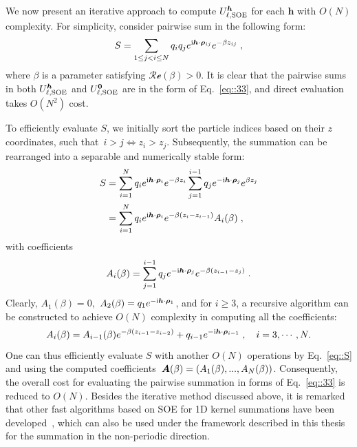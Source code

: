 We now present an iterative approach to compute $U_{\ell,\text{SOE}}^{\boldsymbol{h}}$ for each $\bm{h}$ with $O(N)$ complexity. 
For simplicity, consider pairwise sum in the following form:
\begin{equation}\label{eq::33}
	S = \sum_{1\leq j < i \leq N} q_{i} q_{j} e^{\mathrm{i} \boldsymbol{h} \cdot \boldsymbol{\rho}_{ij}} e^{ - \beta z_{ij} }\;,
\end{equation}
where $\beta$ is a parameter satisfying $\mathscr{Re}(\beta)>0$. It is clear that the pairwise sums in both $U_{\ell,\text{SOE}}^{\boldsymbol{h}}$ and $U_{\ell,\text{SOE}}^{\boldsymbol{0}}$ are in the form of Eq.~\eqref{eq::33}, and direct evaluation takes $O(N^2)$ cost. 

To efficiently evaluate $S$, we initially sort the particle indices based on their $z$ coordinates, such that~$i > j \iff z_i > z_j$.
Subsequently, the summation can be rearranged into a separable and numerically stable form:
\begin{align}
	S &=\sum_{i = 1}^N q_{i} e^{\mathrm{i} \bm{h}\cdot\bm{\rho}_{i}}e^{-\beta z_{i}} \sum_{j = 1}^{i - 1} q_{j} e^{-\mathrm{i} \bm{h}\cdot\bm{\rho}_{j}}e^{\beta z_{j}} \label{eq::S0} \\ 
	&= \sum_{i = 1}^N q_{i} e^{\mathrm{i} \bm{h}\cdot\bm{\rho}_{i}}e^{-\beta(z_{i} - z_{i - 1})}A_{i}(\beta)\;, \label{eq::S}
\end{align}
with coefficients
\begin{equation}
	A_{i}(\beta) =  \sum_{j = 1}^{i - 1} q_{j} e^{-\mathrm{i} \bm{h}\cdot\bm{\rho}_{j}}e^{-\beta(z_{i - 1} - z_{j})}\;.
\end{equation}
Clearly, $A_1(\beta)=0,$ $A_2(\beta)=q_1e^{-\mathrm{i} \bm{h}\cdot\bm{\rho}_1}$, and for $i\geq 3$, a recursive algorithm can be constructed to achieve $O(N)$ complexity in computing all the coefficients:
\begin{equation}\label{eq::35}
	A_{i}(\beta) = A_{i - 1}(\beta) e^{-\beta(z_{i - 1} - z_{i - 2})} + q_{i - 1}e^{-\mathrm{i} \bm{h}\cdot\bm{\rho}_{i-1}}\;,\quad i = 3, \cdots, N.
\end{equation}
One can thus efficiently evaluate $S$ with another $O(N)$ operations by Eq.~\eqref{eq::S} and using the computed coefficients~$\boldsymbol{A}(\beta) = (A_1(\beta), ..., A_N(\beta))$. 
Consequently, the overall cost for evaluating the pairwise summation in forms of Eq.~\eqref{eq::33} is reduced to $O(N)$.
Besides the iterative method discussed above, it is remarked that other fast algorithms based on SOE for 1D kernel summations have been developed~\cite{jiang2021approximating,GIMBUTAS2020815}, which can also be used under the framework described in this thesis for the summation in the non-periodic direction.

